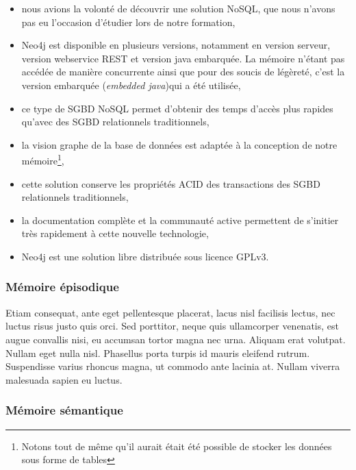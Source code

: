 \begin{itemize}
\item nous avions la volonté de découvrir une solution \gls{NoSQL}, que nous n'avons pas eu l'occasion d'étudier lors de notre formation,

\item Neo4j est disponible en plusieurs versions, notamment en version serveur, version webservice REST et version java embarquée. La mémoire n'étant pas accédée de manière concurrente ainsi que pour des soucis de légèreté, c'est la version embarquée (\emph{embedded java})qui a été utilisée,

\item ce type de SGBD \gls{NoSQL} permet d'obtenir des temps d'accès plus rapides qu'avec des SGBD relationnels traditionnels,

\item la vision graphe de la base de données est adaptée à la conception de notre mémoire\footnote{Notons tout de même qu'il aurait était été possible de stocker les données sous forme de tables},

\item cette solution conserve les propriétés ACID des transactions des SGBD relationnels traditionnels,

\item la documentation complète et la communauté active permettent de s'initier très rapidement à cette nouvelle technologie,

\item Neo4j est une solution libre distribuée sous licence GPLv3.
\end{itemize}

\subsubsection{Mémoire épisodique}

Etiam consequat, ante eget pellentesque placerat, lacus nisl facilisis lectus, nec luctus risus justo quis orci. Sed porttitor, neque quis ullamcorper venenatis, est augue convallis nisi, eu accumsan tortor magna nec urna. Aliquam erat volutpat. Nullam eget nulla nisl. Phasellus porta turpis id mauris eleifend rutrum. Suspendisse varius rhoncus magna, ut commodo ante lacinia at. Nullam viverra malesuada sapien eu luctus. 

\subsubsection{Mémoire sémantique}

